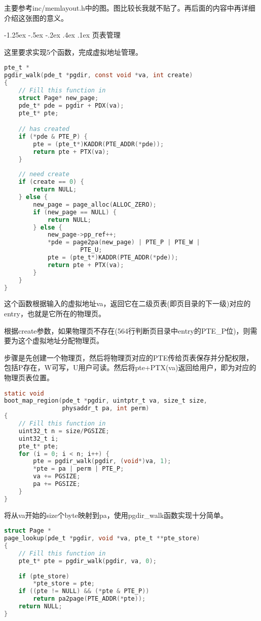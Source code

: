 \documentclass[11pt,a4paper]{article}
\makeatletter
\newcommand{\sihao}{\fontsize{14pt}{\baselineskip}\selectfont}
\renewcommand\subsection{\@startsection{subsection}{1}{\z@}%
{-1.25ex \@plus -.5ex \@minus -.2ex}%
{.4ex \@plus .1ex}%
{\normalfont\sihao\fontspec{黑体}}}
\makeatother
\begin{document}
主要参考inc/memlayout.h中的图。图比较长我就不贴了。再后面的内容中再详细介绍这张图的意义。

\subsection{页表管理}

这里要求实现5个函数，完成虚拟地址管理。

\setmainfont{Consolas}
\begin{lstlisting}[language={C},firstnumber=555,title=kern/pmap.c]
pte_t *
pgdir_walk(pde_t *pgdir, const void *va, int create)
{
	// Fill this function in
	struct Page* new_page;
	pde_t* pde = pgdir + PDX(va);
	pte_t* pte;

	// has created
	if (*pde & PTE_P) {
		pte = (pte_t*)KADDR(PTE_ADDR(*pde));
		return pte + PTX(va);
	}
	
	// need create
	if (create == 0) {
		return NULL;
	} else {
		new_page = page_alloc(ALLOC_ZERO);
		if (new_page == NULL) {
			return NULL;
		} else {
			new_page->pp_ref++;
			*pde = page2pa(new_page) | PTE_P | PTE_W |
					 PTE_U;
			pte = (pte_t*)KADDR(PTE_ADDR(*pde));
			return pte + PTX(va);
		}
	}
}
\end{lstlisting}
\setmainfont[BoldFont=黑体]{宋体}

这个函数根据输入的虚拟地址va，返回它在二级页表(即页目录的下一级)对应的entry，也就是它所在的物理页。

根据create参数，如果物理页不存在(564行判断页目录中entry的PTE\_P位)，则需要为这个虚拟地址分配物理页。

步骤是先创建一个物理页，然后将物理页对应的PTE传给页表保存并分配权限，包括P存在，W可写，U用户可读。然后将pte+PTX(va)返回给用户，即为对应的物理页表位置。


\setmainfont{Consolas}
\begin{lstlisting}[language={C},firstnumber=595,title=kern/pmap.c]
static void
boot_map_region(pde_t *pgdir, uintptr_t va, size_t size,
				physaddr_t pa, int perm)
{
	// Fill this function in
	uint32_t n = size/PGSIZE;
	uint32_t i;
	pte_t* pte;
	for (i = 0; i < n; i++) {
		pte = pgdir_walk(pgdir, (void*)va, 1);
		*pte = pa | perm | PTE_P;
		va += PGSIZE;
		pa += PGSIZE;
	}
}
\end{lstlisting}
\setmainfont[BoldFont=黑体]{宋体}

将从va开始的size个byte映射到pa，使用pgdir\_walk函数实现十分简单。

\setmainfont{Consolas}
\begin{lstlisting}[language={C},firstnumber=670,title=kern/pmap.c]
struct Page *
page_lookup(pde_t *pgdir, void *va, pte_t **pte_store)
{
	// Fill this function in
	pte_t* pte = pgdir_walk(pgdir, va, 0);
	
	if (pte_store)
		*pte_store = pte;
	if ((pte != NULL) && (*pte & PTE_P))
		return pa2page(PTE_ADDR(*pte));
	return NULL;
}
\end{lstlisting}
\setmainfont[BoldFont=黑体]{宋体}
\end{document}
